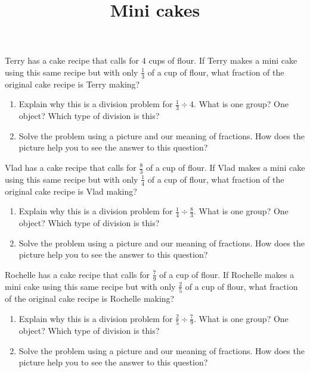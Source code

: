 \documentclass[nooutcomes,noauthor, handout]{ximera}
\title{Mini cakes}
\begin{document}
\begin{abstract}
\end{abstract}

\maketitle


\begin{problem}
Terry has a cake recipe that calls for $4$ cups of flour. If Terry makes a mini cake using this same recipe but with only $\frac{1}{3}$ of a cup of flour, what fraction of the original cake recipe is Terry making?

\begin{enumerate}
	\item Explain why this is a division problem for $\frac{1}{3} \div 4$. What is one group? One object? Which type of division is this?
	\item Solve the problem using a picture and our meaning of fractions. How does the picture help you to see the answer to this question?
\end{enumerate}
\end{problem}



\begin{problem}
Vlad has a cake recipe that calls for $\frac{8}{3}$ of a cup of flour. If Vlad makes a mini cake using this same recipe but with only $\frac{1}{4}$ of a cup of flour, what fraction of the original cake recipe is Vlad making?
\begin{enumerate}
	\item Explain why this is a division problem for $\frac{1}{4} \div \frac{8}{3}$. What is one group? One object? Which type of division is this?
	\item Solve the problem using a picture and our meaning of fractions. How does the picture help you to see the answer to this question?
\end{enumerate}
\end{problem}


\begin{problem}
Rochelle has a cake recipe that calls for $\frac{7}{9}$ of a cup of flour. If Rochelle makes a mini cake using this same recipe but with only $\frac{2}{5}$ of a cup of flour, what fraction of the original cake recipe is Rochelle making?
\begin{enumerate}
	\item Explain why this is a division problem for $\frac{2}{5} \div \frac{7}{9}$. What is one group? One object? Which type of division is this?
	\item Solve the problem using a picture and our meaning of fractions. How does the picture help you to see the answer to this question?
\end{enumerate}
\end{problem}
\end{document}
